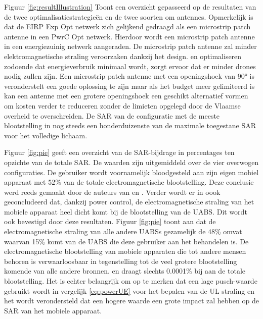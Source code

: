 \documentclass[twocolumn]{phdsymp_dutch}
\begin{document}
Figuur \ref{fig:resultIllustration}  Toont een overzicht gepasseerd op de resultaten van de twee optimalisatiestrategieën en de twee soorten om antennes.
Opmerkelijk is dat de \gls{EIRP} \gls{Exp Opt} netwerk zich gelijkend gedraagd als een microstrip patch antenne in een \gls{PwrC Opt} netwerk.
Hierdoor wordt een microstrip patch antenne in een energiezuinig netwerk aangeraden. De microstrip patch antenne zal minder elektromagnetische straling veroorzaken dankzij het design.
en optimaliseren zodoende dat energieverbruik minimaal wordt, zorgt ervoor dat er minder drones nodig zullen zijn.
Een microstrip patch antenne met een openingshoek van \ang{90} is veronderstelt een goede oplossing te zijn
 maar als het budget meer gelimiteerd is kan een antenne met een grotere openingshoek een geschikt alternatief vormen
 om kosten verder te reduceren zonder de limieten opgelegd door de Vlaamse overheid te overschreiden.
De \gls{SAR} van de configuratie met de meeste blootstelling in nog steeds een honderduizenste van de maximale toegestane \gls{SAR} voor het volledige lichaam.

Figuur \ref{fig:pie} geeft een overzicht van de \gls{SAR}-bijdrage in percentages ten opzichte van de totale \gls{SAR}.
De waarden zijn uitgemiddeld over de vier overwogen configuraties.
De gebruiker wordt voornamelijk bloodgesteld aan zijn eigen mobiel apparaat met 
52\% van de totale electromagnetische blootstelling.
Deze conclusie werd reeds gemaakt door de auteurs van 
\cite{J17_kuehn2019modelling} en  \cite{J10.1.1}.
Verder wordt er in \cite{J10.1.1} oook geconcludeerd dat, dankzij power control, 
de electromagnetische straling van het mobiele apparaat heel dicht komt bij de blootstelling van de \gls{UABS}.
Dit wordt ook bevestigd door deze resultaten. Figuur \ref{fig:pie} toont aan dat de electromagnetische straling van 
alle andere \gls{UABS}s  gezamelijk de 48\% omvat waarvan 15\% komt van de \gls{UABS} die deze gebruiker aan het behandelen is.
De electromagnetische blootstelling van mobiele apparaten die tot andere mensen behoren 
is verwaarloosbaar in tegenstelling tot de veel grotere blootstelling komende van alle andere bronnen.
en draagt slechts 0.0001\% bij aan de totale blootstelling. Het is echter belangrijk om op te merken dat 
een lage \gls{pusch}-waarde gebruikt wordt in vergelijk \ref{eq:powerUE} voor het bepalen van de
 \gls{UL} straling en het wordt verondersteld dat een hogere waarde een grote impact zal hebben op de \gls{SAR} van het mobiele apparaat.
\end{document}
